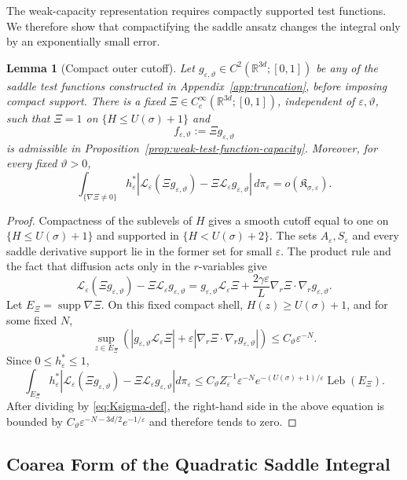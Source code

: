 \documentclass[11pt]{article}
\numberwithin{equation}{section}
\theoremstyle{plain}
\newtheorem{lemma}[theorem]{Lemma}
\theoremstyle{definition}
\theoremstyle{remark}
\newcommand{\R}{\mathbb R}
\newcommand{\eps}{\varepsilon}
\newcommand{\calL}{\mathcal L}
\begin{document}
The weak-capacity representation requires compactly supported
test functions.  We therefore show that compactifying the saddle ansatz
changes the integral only by an exponentially small error.

\begin{lemma}[Compact outer cutoff]
\label{lem:compact-outer-cutoff}
Let $g_{\eps,\vartheta}\in C^2(\R^{3d};[0,1])$ be any of the saddle test
functions constructed in Appendix~\ref{app:truncation}, before imposing compact
support.  There is a fixed $\Xi\in C_c^\infty(\R^{3d};[0,1])$, independent of
$\eps,\vartheta$, such that $\Xi=1$ on $\{H\le U(\sigma)+1\}$ and
\[
f_{\eps,\vartheta}:=\Xi g_{\eps,\vartheta}
\]
is admissible in Proposition~\ref{prop:weak-test-function-capacity}.  Moreover,
for every fixed $\vartheta>0$,
\begin{equation}
\label{eq:outer-cutoff-error}
\int_{\{\nabla\Xi\ne0\}}h_\eps^*
\left|\calL_\eps(\Xi g_{\eps,\vartheta})
-\Xi\calL_\eps g_{\eps,\vartheta}\right|\,d\pi_\eps
=o(\mathfrak K_{\sigma,\eps}).
\end{equation}
\end{lemma}

\begin{proof}
Compactness of the sublevels of $H$ gives a smooth cutoff equal to one on
$\{H\le U(\sigma)+1\}$ and supported in $\{H<U(\sigma)+2\}$.  The sets
$A_\eps,S_\eps$ and every saddle derivative support lie in the former set for
small $\eps$.  The product rule and the fact that diffusion acts only in the
$r$-variables give
\[
\calL_\eps(\Xi g_{\eps,\vartheta})
-\Xi\calL_\eps g_{\eps,\vartheta}
=g_{\eps,\vartheta}\calL_\eps\Xi
+\frac{2\gamma\eps}{L}
\nabla_r\Xi\cdot\nabla_rg_{\eps,\vartheta}.
\]
Let $E_\Xi=\operatorname{supp}\nabla\Xi$.  On this fixed compact shell,
$H(z)\ge U(\sigma)+1$, and for some fixed $N$,
\[
\sup_{z\in E_\Xi}\left(
|g_{\eps,\vartheta}\calL_\eps\Xi|
+\eps|\nabla_r\Xi\cdot\nabla_rg_{\eps,\vartheta}|
\right)
\le C_\vartheta\eps^{-N}.
\]
Since $0\le h_\eps^*\le1$,
\[
\int_{E_\Xi}h_\eps^*
\left|\calL_\eps(\Xi g_{\eps,\vartheta})
-\Xi\calL_\eps g_{\eps,\vartheta}\right|d\pi_\eps
\le
C_\vartheta Z_\eps^{-1}\eps^{-N}
e^{-(U(\sigma)+1)/\eps}\operatorname{Leb}(E_\Xi).
\]
After dividing by \eqref{eq:Ksigma-def}, the right-hand side in the above equation 
is bounded by
$C_\vartheta\eps^{-N-3d/2}e^{-1/\eps}$ and therefore tends to zero.
\end{proof}

\subsection{Coarea Form of the Quadratic Saddle Integral}
\label{app:coarea}
\end{document}

